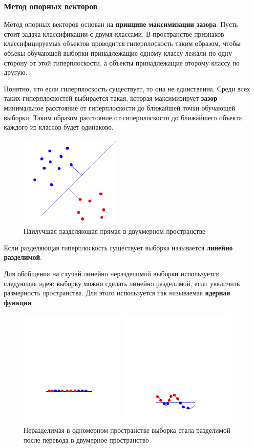 \subsubsection{Метод опорных векторов}
Метод опорных векторов основан на \textbf{принципе максимизации зазора}. Пусть стоит задача классификации с двумя классами. В пространстве признаков классифицируемых объектов проводится гиперплоскость таким образом, чтобы объекы обучающей выборки принадлежащие одному классу лежали по одну сторону от этой гиперплоскости, а объекты принадлежащие второму классу по другую.

Понятно, что если гиперплоскость существует, то она не единственна. Среди всех таких гиперплоскостей выбирается такая, которая максимизирует \textbf{зазор} -- минимальное расстояние от гиперплоскости до ближайшей точки обучающей выборки. Таким образом расстояние от гиперплоскости до ближайшего объекта каждого из классов будет одинаково.

\begin{figure}[h]
\begin{center}
\includegraphics[width=5cm]{img/svm}
\end{center}
\caption{Наилучшая разделяющая прямая в двухмерном пространстве}
\label{svm}
\end{figure}

Если разделяющая гиперплоскость существует выборка называется \textbf{линейно разделимой}.

Для обобщения на случай линейно неразделимой выборки используется следующая идея: выборку можно сделать линейно разделимой, если увеличить размерность пространства. Для этого используется так называемая \textbf{ядерная функция}

\begin{figure}[h]
\begin{center}
\includegraphics[width=15cm]{img/svm2}
\end{center}
\caption{Неразделимая в одномерном пространстве выборка стала разделимой после перевода в двумерное пространство}
\label{svm-kernel}
\end{figure}

